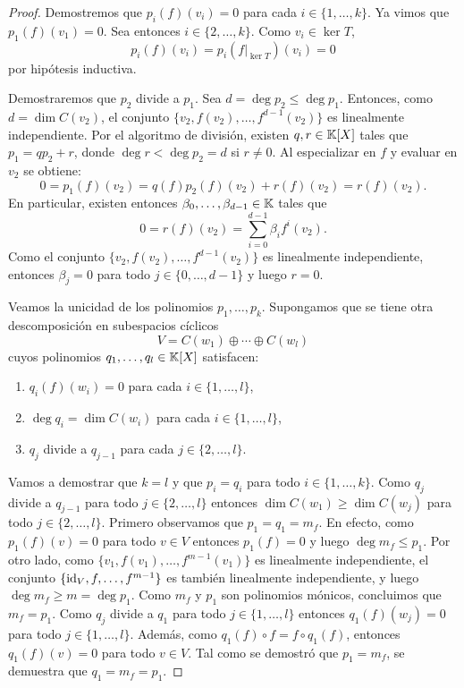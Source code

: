 \begin{thm}
\begin{proof}
		Demostremos que $p_i(f)(v_i)=0$ para cada $i\in\{1,\dots,k\}$. Ya vimos
		que $p_1(f)(v_1)=0$. Sea entonces $i\in\{2,\dots,k\}$.  Como
		$v_i\in\ker T$, 
		\[
		p_i(f)(v_i)=p_i\left(f|_{\ker T}\right)(v_i)=0
		\]
		por hipótesis inductiva. 

		Demostraremos que $p_2$ divide a $p_1$.  Sea $d=\deg p_2\leq\deg p_1$.
		Entonces, como $d=\dim C(v_2)$, el conjunto
		$\{v_2,f(v_2),\dots,f^{d-1}(v_2)\}$ es linealmente independiente.  Por
		el algoritmo de división, existen $q,r\in\mathbb{K}[X]$ tales que $p_1=qp_2+r$,
		donde $\deg r< \deg p_2=d$ si $r\ne0$. Al especializar en $f$ y evaluar
		en $v_2$ se obtiene:
        \[
            0=p_1(f)(v_2)=q(f)p_2(f)(v_2)+r(f)(v_2)=r(f)(v_2).
        \]
		En particular, existen entonces $\beta_0,\dots,\beta_{d-1}\in\mathbb{K}$ tales
		que
        \[
            0=r(f)(v_2)=\sum_{i=0}^{d-1}\beta_if^i(v_2).
        \]
		Como el conjunto $\{v_2,f(v_2),\dots,f^{d-1}(v_2)\}$ es linealmente
		independiente, entonces $\beta_j=0$ para todo $j\in\{0,\dots,d-1\}$ y
		luego $r=0$. 
       
		Veamos la unicidad de los polinomios $p_1,\dots,p_k$.  Supongamos que
		se tiene otra descomposición en subespacios cíclicos
        \[
            V=C(w_1)\oplus\cdots\oplus C(w_l)
        \]
        cuyos polinomios $q_1,\dots,q_l\in\mathbb{K}[X]$ satisfacen:
		\begin{enumerate}
			\item $q_i(f)(w_i)=0$ para cada $i\in\{1,\dots,l\}$,
			\item $\deg q_i=\dim C(w_i)$ para cada $i\in\{1,\dots,l\}$, 
			\item $q_j$ divide a $q_{j-1}$ para cada $j\in\{2,\dots,l\}$. 
		\end{enumerate}
		Vamos a demostrar que $k=l$ y que $p_i=q_i$ para todo
		$i\in\{1,\dots,k\}$.  Como $q_j$ divide a $q_{j-1}$ para todo
		$j\in\{2,\dots,l\}$ entonces $\dim C(w_1)\geq \dim C(w_j)$ para todo
		$j\in\{2,\dots,l\}$. 
		Primero observamos que $p_1=q_1=m_f$. En efecto, como $p_1(f)(v)=0$ para todo
        $v\in V$ entonces $p_1(f)=0$ y luego $\deg m_f\leq p_1$. Por otro lado,
        como $\{v_1,f(v_1),\dots,f^{m-1}(v_1)\}$ es linealmente
        independiente, el conjunto $\{\operatorname{id}_V,f,\dots,f^{m-1}\}$ es también
        linealmente independiente, y luego $\deg m_f\geq m=\deg p_1$.  Como
        $m_f$ y $p_1$ son polinomios mónicos, concluimos que $m_f=p_1$.  Como
        $q_j$ divide a $q_1$ para todo $j\in\{1,\dots,l\}$ entonces
        $q_1(f)(w_j)=0$ para todo $j\in\{1,\dots,l\}$. Además, como
        $q_1(f)\circ f=f\circ q_1(f)$, entonces $q_1(f)(v)=0$ para todo $v\in
        V$. Tal como se demostró que $p_1=m_f$, se demuestra que $q_1=m_f=p_1$. 


\end{proof}
\end{thm}
